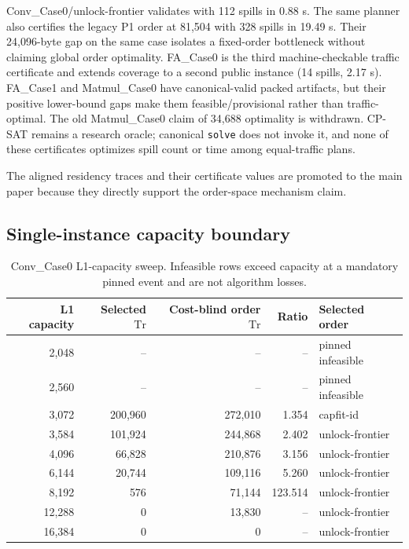 Conv\_Case0/unlock-frontier validates with 112 spills in 0.88 s.  The same
planner also certifies the legacy P1 order at 81,504 with 328 spills in 19.49 s.
Their 24,096-byte gap on the same case isolates a fixed-order bottleneck without
claiming global order optimality.  FA\_Case0 is the third machine-checkable
traffic certificate and extends coverage to a second public instance
(14 spills, 2.17 s).  FA\_Case1 and Matmul\_Case0 have
canonical-valid packed artifacts, but their positive lower-bound gaps make them
feasible/provisional rather than traffic-optimal.  The old Matmul\_Case0 claim
of 34,688 optimality is withdrawn.  CP-SAT remains a research oracle;
canonical \texttt{solve} does not invoke it, and none of these certificates
optimizes spill count or time among equal-traffic plans.

The aligned residency traces and their certificate values are promoted to the
main paper because they directly support the order-space mechanism claim.

\subsection{Single-instance capacity boundary}\label{sec:supp-robustness}

\begin{table}[htbp]
\centering
\caption{Conv\_Case0 L1-capacity sweep.  Infeasible rows exceed capacity at a
mandatory pinned event and are not algorithm losses.}
\label{tab:supp-capacity}
\begin{tabular}{rrrrl}
\toprule
L1 capacity & Selected $\mathrm{Tr}$ & Cost-blind order $\mathrm{Tr}$ & Ratio & Selected order\\
\midrule
2,048 & -- & -- & -- & pinned infeasible\\
2,560 & -- & -- & -- & pinned infeasible\\
3,072 & 200,960 & 272,010 & 1.354 & capfit-id\\
3,584 & 101,924 & 244,868 & 2.402 & unlock-frontier\\
4,096 & 66,828 & 210,876 & 3.156 & unlock-frontier\\
6,144 & 20,744 & 109,116 & 5.260 & unlock-frontier\\
8,192 & 576 & 71,144 & 123.514 & unlock-frontier\\
12,288 & 0 & 13,830 & -- & unlock-frontier\\
16,384 & 0 & 0 & -- & unlock-frontier\\
\bottomrule
\end{tabular}
\end{table}

